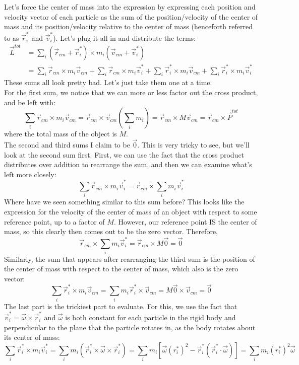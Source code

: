 Let's force the center of mass into the expression by expressing each position and velocity vector of each particle as the sum of the position/velocity of the center of mass and its position/velocity relative to the center of mass (henceforth referred to as $\vec r_i^*$ and $\vec v_i^*$). Let's plug it all in and distribute the terms:
\begin{align*}
	\vec L^{tot} &= \sum_i (\vec r_{cm} + \vec r_i^*) \times m_i(\vec v_{cm} + \vec v_i^*) \\
	&= \sum_i \vec r_{cm} \times m_i \vec v_{cm} + \sum_i \vec r_{cm} \times m_i \vec v_i^* + \sum_i \vec r_i^* \times m_i \vec v_{cm} + \sum_i \vec r_i^* \times m_i \vec v_i^* 
\end{align*}
These sums all look pretty bad. Let's just take them one at a time. \\
For the first sum, we notice that we can more or less factor out the cross product, and be left with: 
\[
	\sum_i \vec r_{cm} \times m_i \vec v_{cm} = \vec r_{cm} \times \vec v_{cm} \left(\sum_i m_i \right) = \vec r_{cm} \times M\vec v_{cm} = \vec r_{cm} \times \vec P^{tot}
\]
where the total mass of the object is $M$. \\
The second and third sums I claim to be $\vec 0$. This is very tricky to see, but we'll look at the second sum first. First, we can use the fact that the cross product distributes over addition to rearrange the sum, and then we can examine what's left more closely:
\[
	\sum_i \vec r_{cm} \times m_i \vec v_i^*  = \vec r_{cm} \times \sum_i  m_i \vec v_i^*
\]
Where have we seen something similar to this sum before? This looks like the expression for the velocity of the center of mass of an object with respect to some reference point, up to a factor of $M$. However, our reference point IS the center of mass, so this clearly then comes out to be the zero vector. Therefore, 
\[
	\vec r_{cm} \times \sum_i  m_i \vec v_i^* = \vec r_{cm} \times M\vec 0 = \vec 0
\]
Similarly, the sum that appears after rearranging the third sum is the position of the center of mass with respect to the center of mass, which also is the zero vector:
\[
	\sum_i \vec r_i^* \times m_i \vec v_{cm} = \sum_i m_i \vec r_i^* \times \vec v_{cm} = M\vec 0 \times \vec v_{cm} = \vec 0 
\]
The last part is the trickiest part to evaluate. For this, we use the fact that $\vec v_i^* = \vec \omega \times \vec r_i^*$ and $\vec \omega$ is both constant for each particle in the rigid body and perpendicular to the plane that the particle rotates in, as the body rotates about its center of mass: 
\[
	\sum_i \vec r_i^* \times m_i \vec v_i^* = \sum_i m_i (\vec r_i^* \times \vec \omega \times \vec r_i^*) = \sum_i m_i \left[ \vec \omega \left(r_i^*\right)^2 - \vec r_i^*(\vec r_i^* \cdot \vec \omega) \right]  = \sum_i m_i \left(r_i^*\right)^2 \vec \omega
\]
